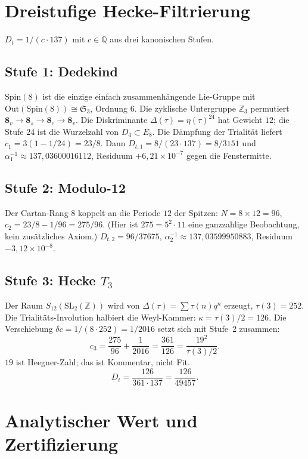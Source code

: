 \documentclass[11pt,a4paper]{article}
\theoremstyle{definition}
\theoremstyle{remark}
\numberwithin{equation}{section}
\begin{document}
\section{Dreistufige Hecke-Filtrierung}

$D_t=1/(c\cdot 137)$ mit $c\in\mathbb{Q}$ aus drei kanonischen Stufen.

\subsection{Stufe 1: Dedekind}
$\mathrm{Spin}(8)$ ist die einzige einfach zusammenhängende Lie-Gruppe mit $\mathrm{Out}(\mathrm{Spin}(8))\cong\mathfrak{S}_3$, Ordnung $6$.
Die zyklische Untergruppe $\mathbb{Z}_3$ permutiert $\mathbf{8}_v\to\mathbf{8}_s\to\mathbf{8}_c\to\mathbf{8}_v$.
Die Diskriminante $\Delta(\tau)=\eta(\tau)^{24}$ hat Gewicht $12$; die Stufe $24$ ist die Wurzelzahl von $D_4\subset E_8$.
Die Dämpfung der Trialität liefert
$c_1=3(1-1/24)=23/8$.
Dann $D_{t,1}=8/(23\cdot 137)=8/3151$ und
$\alpha^{-1}_1\approx 137{,}03600016112$, Residuum $+6{,}21\times 10^{-7}$ gegen die Fenstermitte.

\subsection{Stufe 2: Modulo-12}
Der Cartan-Rang $8$ koppelt an die Periode $12$ der Spitzen:
$N=8\times 12=96$, $c_2=23/8-1/96=275/96$.
(Hier ist $275=5^2\cdot 11$ eine ganzzahlige Beobachtung, kein zusätzliches Axiom.)
$D_{t,2}=96/37675$, $\alpha^{-1}_2\approx 137{,}03599950883$, Residuum $-3{,}12\times 10^{-8}$.

\subsection{Stufe 3: Hecke $T_3$}
Der Raum $S_{12}(\mathrm{SL}_2(\mathbb{Z}))$ wird von $\Delta(\tau)=\sum\tau(n)q^n$ erzeugt, $\tau(3)=252$.
Die Trialitäts-Involution halbiert die Weyl-Kammer: $\kappa=\tau(3)/2=126$.
Die Verschiebung $\delta c=1/(8\cdot 252)=1/2016$ setzt sich mit Stufe~2 zusammen:
\begin{equation}
c_3=\frac{275}{96}+\frac{1}{2016}=\frac{361}{126}=\frac{19^2}{\tau(3)/2}.
\end{equation}
$19$ ist Heegner-Zahl; das ist Kommentar, nicht Fit.
\begin{equation}
D_t=\frac{126}{361\cdot 137}=\frac{126}{49457}.
\end{equation}

\section{Analytischer Wert und Zertifizierung}
\end{document}
